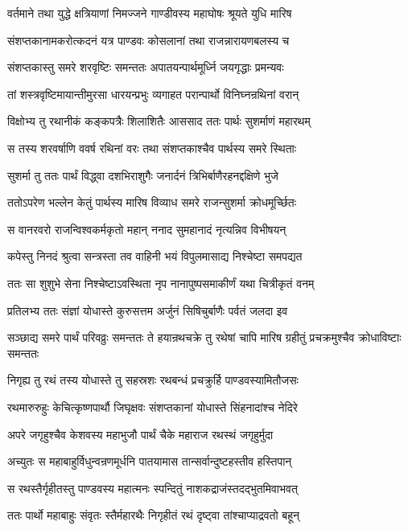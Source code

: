 \twolineshloka
{वर्तमाने तथा युद्धे क्षत्रियाणां निमज्जने}
{गाण्डीवस्य महाघोषः श्रूयते युधि मारिष}


\twolineshloka
{संशप्तकानामकरोत्कदनं यत्र पाण्डवः}
{कोसलानां तथा राजन्नारायणबलस्य च}


\twolineshloka
{संशप्तकास्तु समरे शरवृष्टिः समन्ततः}
{अपातयन्पार्थमूर्ध्नि जयगृद्धाः प्रमन्यवः}


\twolineshloka
{तां शस्त्रवृष्टिमायान्तीमुरसा धारयन्प्रभुः}
{व्यगाहत परान्पार्थो विनिघ्नन्रथिनां वरान्}


\twolineshloka
{विक्षोभ्य तु रथानीकं कङ्कपत्रैः शिलाशितैः}
{आससाद ततः पार्थः सुशर्माणं महारथम्}


\twolineshloka
{स तस्य शरवर्षाणि ववर्ष रथिनां वरः}
{तथा संशप्तकाश्चैव पार्थस्य समरे स्थिताः}


\twolineshloka
{सुशर्मा तु ततः पार्थं विद्ध्वा दशभिराशुगैः}
{जनार्दनं त्रिभिर्बाणैरहनद्दक्षिणे भुजे}


\twolineshloka
{ततोऽपरेण भल्लेन केतुं पार्थस्य मारिष}
{विव्याध समरे राजन्सुशर्मा क्रोधमूर्च्छितः}


\twolineshloka
{स वानरवरो राजन्विश्वकर्मकृतो महान्}
{ननाद सुमहानादं नृत्यन्निव विभीषयन्}


\twolineshloka
{कपेस्तु निनदं श्रुत्वा सन्त्रस्ता तव वाहिनी}
{भयं विपुलमासाद्य निश्चेष्टा समपद्यत}


\twolineshloka
{ततः सा शुशुभे सेना निश्चेष्टाऽवस्थिता नृप}
{नानापुष्पसमाकीर्णं यथा चित्रीकृतं वनम्}


\twolineshloka
{प्रतिलभ्य ततः संज्ञां योधास्ते कुरुसत्तम}
{अर्जुनं सिषिचुर्बाणैः पर्वतं जलदा इव}


\threelineshloka
{सञ्छाद्य समरे पार्थं परिवव्रुः समन्ततः}
{ते हयान्रथचक्रे तु रथेषां चापि मारिष}
{ग्रहीतुं प्रचक्रमुश्चैव क्रोधाविष्टाः समन्ततः}


\twolineshloka
{निगृह्य तु रथं तस्य योधास्ते तु सहस्रशः}
{रथबन्धं प्रचक्रुर्हि पाण्डवस्यामितौजसः}


\twolineshloka
{रथमारुरुहुः केचित्कृष्णपार्थौ जिघृक्षवः}
{संशप्तकानां योधास्ते सिंहनादांश्च नेदिरे}


\twolineshloka
{अपरे जगृहुश्चैव केशवस्य महाभुजौ}
{पार्थं चैके महाराज रथस्थं जगृहुर्मुदा}


\twolineshloka
{अच्युतः स महाबाहुर्विधुन्वन्रणमूर्धनि}
{पातयामास तान्सर्वान्दुष्टहस्तीव हस्तिपान्}


\twolineshloka
{स रथस्तैर्गृहीतस्तु पाण्डवस्य महात्मनः}
{स्पन्दितुं नाशकद्राजंस्तदद्भुतमिवाभवत्}


\twolineshloka
{ततः पार्थो महाबाहुः संवृतः स्तैर्महारथैः}
{निगृहीतं रथं दृष्ट्वा तांश्चाप्याद्रवतो बहून्}


